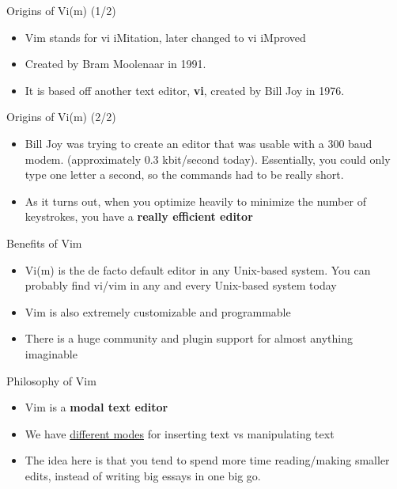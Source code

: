 \documentclass[12pt]{beamer}
\begin{document}
\begin{frame}{Origins of Vi(m) (1/2)}
    \begin{itemize}
        \item Vim stands for vi iMitation, later changed to vi iMproved
        \item Created by Bram Moolenaar in 1991.
        \item It is based off another text editor, \textbf{vi}, created by Bill Joy in 1976.
    \end{itemize}{}
\end{frame}{}

\begin{frame}{Origins of Vi(m) (2/2)}
    \begin{itemize}
        \item Bill Joy was trying to create an editor that was usable with a 300 baud modem. (approximately 0.3 kbit/second today). Essentially, you could only type one letter a second, so the commands had to be really short.
        \item As it turns out, when you optimize heavily to minimize the number of keystrokes, you have a
        \textbf{really efficient editor}
    \end{itemize}{}
\end{frame}{}

\begin{frame}{Benefits of Vim}
    \begin{itemize}
        \item Vi(m) is the de facto default editor in any Unix-based system. You can probably find vi/vim in 
        any and every Unix-based system today
        \item Vim is also extremely customizable and programmable
        \item There is a huge community and plugin support for almost anything imaginable
    \end{itemize}{}
\end{frame}{}

\begin{frame}{Philosophy of Vim}
    \begin{itemize}
        \item Vim is a \textbf{modal text editor}
        \item We have \underline{different modes} for inserting text vs manipulating text
        \item The idea here is that you tend to spend more time reading/making smaller edits, instead of
        writing big essays in one big go.
    \end{itemize}{}
\end{frame}{}
\end{document}
